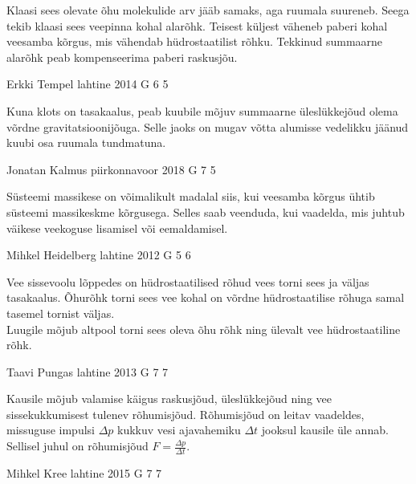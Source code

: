 \documentclass[11pt]{article}
\begin{document}
{{\ifHint
Klaasi sees olevate õhu molekulide arv jääb samaks, aga ruumala suureneb. Seega tekib klaasi sees veepinna kohal alarõhk. Teisest küljest väheneb paberi kohal veesamba kõrgus, mis vähendab hüdrostaatilist rõhku. Tekkinud summaarne alarõhk peab kompenseerima paberi raskusjõu.
\fi
}

{Erkki Tempel} %
{lahtine} %
{2014} %
{G 6} %
{5} %
{

\ifHint
Kuna klots on tasakaalus, peab kuubile mõjuv summaarne üleslükkejõud olema võrdne gravitatsioonijõuga. Selle jaoks on mugav võtta alumisse vedelikku jäänud kuubi osa ruumala tundmatuna.
\fi
}

{Jonatan Kalmus} %
{piirkonnavoor} %
{2018} %
{G 7} %
{5} %
{

\ifHint
Süsteemi massikese on võimalikult madalal siis, kui veesamba kõrgus ühtib süsteemi massikeskme kõrgusega. Selles saab veenduda, kui vaadelda, mis juhtub väikese veekoguse lisamisel või eemaldamisel.
\fi
}

{Mihkel Heidelberg} %
{lahtine} %
{2012} %
{G 5} %
{6} %
{

\ifHint
\osa Vee sissevoolu lõppedes on hüdrostaatilised rõhud vees torni sees ja väljas tasakaalus. Õhurõhk torni sees vee kohal on võrdne hüdrostaatilise rõhuga samal tasemel tornist väljas.\\
\osa Luugile mõjub altpool torni sees oleva õhu rõhk ning ülevalt vee hüdrostaatiline rõhk.
\fi
}

{Taavi Pungas} %
{lahtine} %
{2013} %
{G 7} %
{7} %
{

\ifHint
Kausile mõjub valamise käigus raskusjõud, üleslükkejõud ning vee sissekukkumisest tulenev rõhumisjõud. Rõhumisjõud on leitav vaadeldes, missuguse impulsi $\Delta p$ kukkuv vesi ajavahemiku $\Delta t$ jooksul kausile üle annab. Sellisel juhul on rõhumisjõud $F = \frac{\Delta p}{\Delta t}$.
\fi
}

{Mihkel Kree} %
{lahtine} %
{2015} %
{G 7} %
{7} %
{

}}
\end{document}
